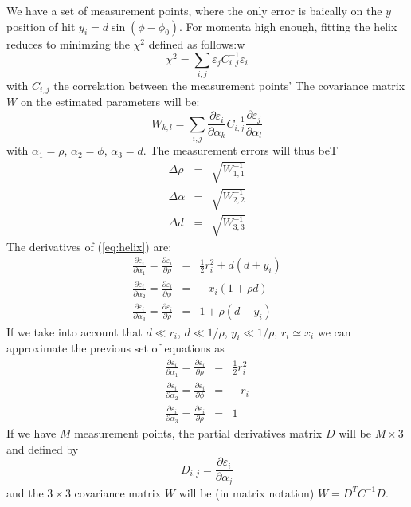 \documentclass[10pt,a4paper]{article}
\begin{document}
We have a set of measurement points, where the only error is baically on the $y$ position of hit
$y_i = d \sin (\phi-\phi_0)$. For momenta high enough,
fitting the helix reduces to minimzing the $\chi^2$ defined as follows:w
\begin{equation}
\label{eq:helix}
\chi^2 = \sum_{i,j} \varepsilon_j C^{-1}_{i,j} \varepsilon_i
\end{equation}
with $C_{i,j}$ the correlation between the measurement points' 
The covariance matrix $W$ on the estimated parameters will be:
\begin{equation}
W_{k,l} = \sum_{i,j} \frac { \partial \varepsilon_i} {\partial \alpha_k} C^{-1}_{i,j}  \frac { \partial \varepsilon_j} {\partial \alpha_l}
\end{equation}
with $\alpha_1 = \rho$, $\alpha_2 = \phi$, $\alpha_3 = d$. The measurement errors will thus beT
\begin{eqnarray}
\Delta \rho &=& \sqrt{W_{1,1}^{-1}} \nonumber \\
\Delta \alpha &=& \sqrt{W_{2,2}^{-1}} \nonumber \\
\Delta d &=& \sqrt{W_{3,3}^{-1}} \nonumber
\end{eqnarray}
The derivatives of (\ref{eq:helix}) are:
\begin{eqnarray}
\frac { \partial \varepsilon_i} {\partial \alpha_1} =
\frac { \partial \varepsilon_i} {\partial \rho} &=& \frac 1 2 r_i^2 + d (d+y_i) \nonumber \\
\frac { \partial \varepsilon_i} {\partial \alpha_2} =
\frac { \partial \varepsilon_i} {\partial \phi} &=& - x_i (1+\rho d) \nonumber \\
\frac { \partial \varepsilon_i} {\partial \alpha_3} =
\frac { \partial \varepsilon_i} {\partial \rho} &=& 1 + \rho (d - y_i) \nonumber 
\end{eqnarray}
If we take into account that $d \ll r_i$, $d \ll 1/\rho$, $y_i \ll 1/\rho$, $r_i \simeq x_i$ we can approximate the previous set of equations as
\begin{eqnarray}
\frac { \partial \varepsilon_i} {\partial \alpha_1} =
\frac { \partial \varepsilon_i} {\partial \rho} &=& \frac 1 2 r_i^2 \nonumber \\
\frac { \partial \varepsilon_i} {\partial \alpha_2} =
\frac { \partial \varepsilon_i} {\partial \phi} &=& - r_i  \nonumber \\
\frac { \partial \varepsilon_i} {\partial \alpha_3} =
\frac { \partial \varepsilon_i} {\partial \rho} &=& 1 \nonumber 
\end{eqnarray}
If we have $M$ measurement points, the partial derivatives matrix $D$ will be $M\times 3$ and defined by
\begin{equation}
D_{i,j} = \frac { \partial \varepsilon_i} {\partial \alpha_j}
\end{equation}
and the $3\times 3$ covariance matrix $W$ will be (in matrix notation) $W=D^{T}C^{-1}D$.
\end{document}
